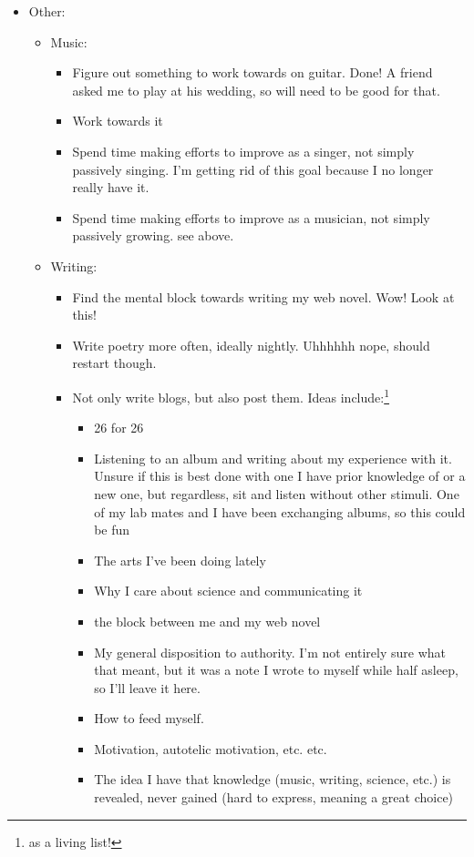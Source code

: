 \documentclass[12pt]{article}[titlepage]
\renewcommand{\,}{\textsuperscript{,}}
\begin{document}
\begin{itemize}
\begin{itemize}
\end{itemize}   
\item Other:   
\begin{itemize}   
\item Music:   
\begin{itemize}   
\item Figure out something to work towards on guitar. Done! A friend asked me to play at his wedding, so will need to be good for that.  
\item Work towards it   
\item Spend time making efforts to improve as a singer, not simply passively singing. I'm getting rid of this goal because I no longer really have it.  
\item Spend time making efforts to improve as a musician, not simply passively growing. see above.  
\end{itemize}   
\item Writing:  
\begin{itemize}   
\item Find the mental block towards writing my web novel. Wow! Look at this!  
\item Write poetry more often, ideally nightly. Uhhhhhh nope, should restart though.  
\item Not only write blogs, but also post them. Ideas include:\footnote{as a living list!}  
\begin{itemize}   
\item 26 for 26   
\item Listening to an album and writing about my experience with it. Unsure if this is best done with one I have prior knowledge of or a new one, but regardless, sit and listen without other stimuli. One of my lab mates and I have been exchanging albums, so this could be fun  
\item The arts I've been doing lately   
\item Why I care about science and communicating it   
\item the block between me and my web novel   
\item My general disposition to authority. I'm not entirely sure what that meant, but it was a note I wrote to myself while half asleep, so I'll leave it here.  
\item How to feed myself.  
\item Motivation, autotelic motivation, etc. etc.  
\item The idea I have that knowledge (music, writing, science, etc.) is revealed, never gained (hard to express, meaning a great choice)  

\end{itemize}
\end{itemize}
\end{itemize}
\end{itemize}
\end{document}

